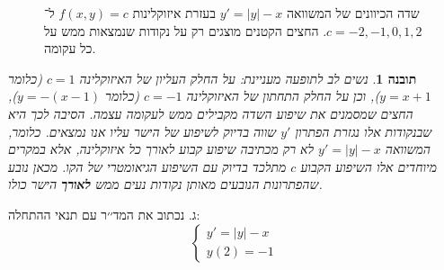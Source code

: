 \documentclass{article}
\numberwithin{equation}{section}
\newtheorem{insight}{תובנה}[section]
\begin{document}
\begin{figure}[H]
\centering
{}
\caption{שדה הכיוונים של המשוואה $y' = |y|-x$ בעזרת איזוקלינות $f(x,y)=c$ 
ל־$c=-2,-1,0,1,2$. החצים הקטנים מוצגים רק על נקודות שנמצאות ממש על כל עקומה.}
\label{fig:dirfield_abs}
\end{figure}

\begin{insight}
נשים לב לתופעה מעניינת: על החלק העליון של האיזוקלינה $c=1$ (כלומר $y=x+1$), 
וכן על החלק התחתון של האיזוקלינה $c=-1$ (כלומר $y=-(x-1)$), 
החצים שמסמנים את שיפוע השדה מקבילים ממש לעקומה עצמה.  
הסיבה לכך היא שבנקודות אלו נגזרת הפתרון $y'$ שווה בדיוק לשיפוע של הישר עליו אנו נמצאים.  
כלומר, המשוואה $y'=|y|-x$ לא רק מכתיבה שיפוע קבוע לאורך כל איזוקלינה, 
אלא במקרים מיוחדים אלו השיפוע הקבוע $c$ מתלכד בדיוק עם השיפוע הגיאומטרי של הקו. 
מכאן נובע שהפתרונות הנובעים מאותן נקודות נעים ממש \textbf{לאורך} הישר כולו.
\end{insight}

ג. נכתוב את המד׳׳ר עם תנאי ההתחלה:
\[
\begin{cases}
y' = |y| - x \\
y(2) = -1
\end{cases}
\]  
\end{document}

